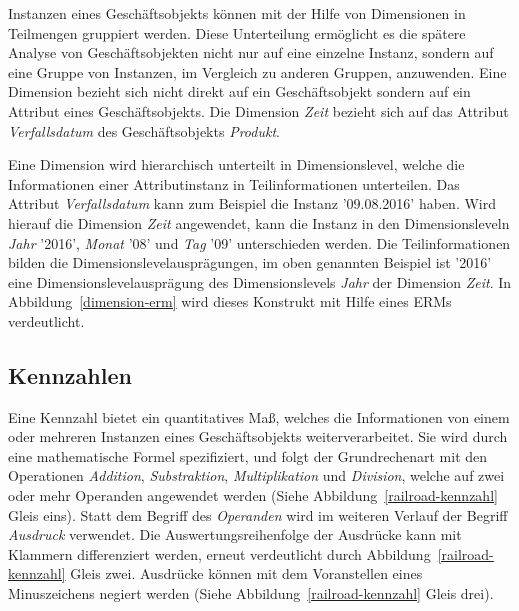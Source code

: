 \documentclass[
  language=german, %
  type=bachelor%
]{isthesis}
\begin{document}
\begin{content}
  Instanzen eines Geschäftsobjekts können mit der Hilfe von Dimensionen in
  Teilmengen gruppiert werden. Diese Unterteilung ermöglicht es die spätere
  Analyse von Geschäftsobjekten nicht nur auf eine einzelne Instanz, sondern auf
  eine Gruppe von Instanzen, \ggf{} im Vergleich zu anderen Gruppen,
  anzuwenden.  Eine Dimension bezieht sich nicht direkt auf ein Geschäftsobjekt
  sondern auf ein Attribut eines Geschäftsobjekts. Die Dimension \textit{Zeit}
  bezieht sich \zB{} auf das Attribut \textit{Verfallsdatum} des
  Geschäftsobjekts \textit{Produkt}. 

  \begin{figure}[caption={Teilsprache---Dimension}, label={dimension-erm}]
    \resizebox{350px}{!}{}
  \end{figure}
  
  Eine Dimension wird hierarchisch unterteilt in Dimensionslevel, welche die
  Informationen einer Attributinstanz in Teilinformationen unterteilen. Das
  Attribut \textit{Verfallsdatum} kann zum Beispiel die Instanz '09.08.2016'
  haben. Wird hierauf die Dimension \textit{Zeit} angewendet, kann die Instanz
  in den Dimensionsleveln \textit{Jahr} '2016', \textit{Monat} '08' und
  \textit{Tag} '09' unterschieden werden. Die Teilinformationen bilden die
  Dimensionslevelausprägungen, im oben genannten Beispiel ist '2016' eine
  Dimensionslevelausprägung des Dimensionslevels \textit{Jahr} der Dimension
  \textit{Zeit}. In Abbildung~\ref{dimension-erm} wird dieses Konstrukt mit
  Hilfe eines \acrshort{ERM}s verdeutlicht.
  
  \subsection{Kennzahlen}

  \begin{figure}[caption={Teilsprache---Kennzahl}, label={kennzahl}]
    \resizebox{250px}{!}{}
  \end{figure}

  Eine Kennzahl bietet ein quantitatives  Maß,
  welches die Informationen von einem oder mehreren Instanzen eines
  Geschäftsobjekts weiterverarbeitet. Sie wird durch eine mathematische Formel
  spezifiziert, und folgt der Grundrechenart mit den Operationen
  \textit{Addition}, \textit{Substraktion}, \textit{Multiplikation} und
  \textit{Division}, welche auf zwei oder mehr Operanden angewendet werden
  (Siehe Abbildung~\ref{railroad-kennzahl} Gleis eins).  Statt dem Begriff des
  \textit{Operanden} wird im weiteren Verlauf der Begriff \textit{Ausdruck}
  verwendet.  Die Auswertungsreihenfolge der Ausdrücke kann mit Klammern
  differenziert werden, erneut verdeutlicht durch
  Abbildung~\ref{railroad-kennzahl} Gleis zwei. Ausdrücke können mit dem
  Voranstellen eines Minuszeichens negiert werden (Siehe
  Abbildung~\ref{railroad-kennzahl} Gleis drei).


\end{content}
\end{document}

